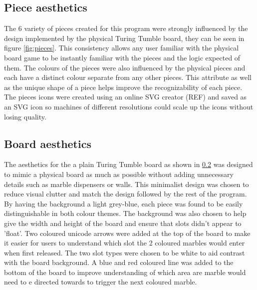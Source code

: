 \documentclass{l4proj}
\begin{document}
\subsection{Piece aesthetics}
The 6 variety of pieces created for this program were strongly influenced by the design implemented by the physical Turing Tumble board, they can be seen in figure \ref{fig:pieces}. This consistency allows any user familiar with the physical board game to be instantly familiar with the pieces and the logic expected of them. The colours of the pieces were also influenced by the physical pieces and each have a distinct colour separate from any other pieces. This attribute as well as the unique shape of a piece helps improve the recognizability of each piece. The pieces icons were created using an online SVG creator (REF) and saved as an SVG icon so machines of different resolutions could scale up the icons without losing quality. 

\subsection{Board aesthetics}
The aesthetics for the a plain Turing Tumble board as shown in \ref{} was designed to mimic a physical board as much as possible without adding unnecessary details such as marble dispensers or walls. This minimalist design was chosen to reduce visual clutter and match the design followed by the rest of the program. By having the background a light grey-blue, each piece was found to be easily distinguishable in both colour themes. The background was also chosen to help give the width and height of the board and ensure that slots didn't appear to 'float'. Two coloured unicode arrows were added at the top of the board to make it easier for users to understand which slot the 2 coloured marbles would enter when first released. The two slot types were chosen to be white to aid contrast with the board background. A blue and red coloured line was added to the bottom of the board to improve understanding of which area are marble would need to e directed towards to trigger the next coloured marble.
\end{document}
